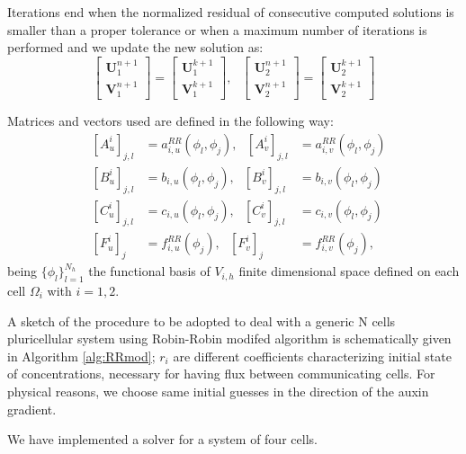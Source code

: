 \documentclass[a4paper]{siamonline220329}
\begin{document}
Iterations end when the normalized residual of consecutive computed solutions is smaller than a proper tolerance or when a maximum number of iterations is performed and we update the new solution as:
 $$\begin{bmatrix} \mathbf{U}_1^{n+1} \\ \mathbf{V}_1^{n+1} \end{bmatrix} = \begin{bmatrix} \mathbf{U}_1^{k+1} \\ \mathbf{V}_1^{k+1} \end{bmatrix}, \ \ \ \begin{bmatrix} \mathbf{U}_2^{n+1} \\ \mathbf{V}_2^{n+1} \end{bmatrix} = \begin{bmatrix} \mathbf{U}_2^{k+1} \\ \mathbf{V}_2^{k+1} \end{bmatrix}$$

Matrices and vectors used are defined in the following way:
\begin{equation}
    \begin{aligned}
    & \left[ A_u^i\right]_{j,l} & = a_{i,u}^{RR}(\phi_l, \phi_j), \ \ \ \left[ A_v^i\right]_{j,l} & = a_{i,v}^{RR}(\phi_l, \phi_j) \\
    & \left[ B_u^i\right]_{j,l} & = b_{i,u}(\phi_l, \phi_j), \ \ \ \left[ B_v^i\right]_{j,l} & = b_{i,v}(\phi_l, \phi_j)\\
    & \left[ C_u^i\right]_{j,l} & = c_{i,u}(\phi_l, \phi_j),\ \ \ \left[ C_v^i\right]_{j,l} & = c_{i,v}(\phi_l, \phi_j)\\
    & \left[F_u^i\right]_{j} & = f_{i,u}^{RR}(\phi_j), \ \ \
    \left[F_v^i\right]_{j} & = f_{i,v}^{RR}(\phi_j),
    \end{aligned}
\end{equation}
being $\{\phi_l\}_{l = 1}^{N_h}$ the functional basis of $V_{i,h}$ finite dimensional space defined on each cell $\Omega_i$ with $i =1,2$.

A sketch of the procedure to be adopted to deal with a generic N cells pluricellular system using Robin-Robin modifed algorithm is schematically given in Algorithm \ref{alg:RRmod}; $r_i$ are different coefficients characterizing initial state of concentrations, necessary for having flux between communicating cells. For physical reasons, we choose same initial guesses in the direction of the auxin gradient.

We have implemented a solver for a system of four cells.
\end{document}
